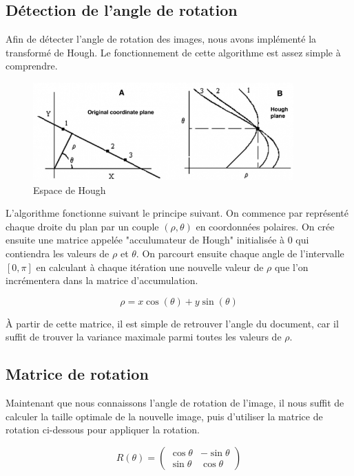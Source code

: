\documentclass[11pt]{report}
\begin{document}
\subsection{Détection de l'angle de rotation}

Afin de détecter l'angle de rotation des images, nous avons implémenté la transformé de Hough. Le fonctionnement de cette algorithme est assez simple à comprendre.

\begin{figure}[htbp]
\centering
\includegraphics[width=10cm]{hough.jpg}
\caption{Espace de Hough}
\end{figure}

L'algorithme fonctionne suivant le principe suivant. On commence par représenté chaque droite du plan par un couple $(\rho, \theta)$ en coordonnées polaires. On crée ensuite une matrice appelée "acculumateur de Hough" initialisée à 0 qui contiendra les valeurs de $\rho$ et $\theta$. On parcourt ensuite chaque angle de l’intervalle $[0, \pi]$ en calculant à chaque itération une nouvelle valeur de $\rho$ que l'on incrémentera dans la matrice d'accumulation.

\[ \rho = x\cos \left( \theta \right) + y\sin \left( \theta \right) \]

À partir de cette matrice, il est simple de retrouver l'angle du document, car il suffit de trouver la variance maximale parmi toutes les valeurs de $\rho$.

\subsection{Matrice de rotation}

Maintenant que nous connaissons l'angle de rotation de l'image, il nous suffit de calculer la taille optimale de la nouvelle image, puis d'utiliser la matrice de rotation ci-dessous pour appliquer la rotation.

\[ R \left( \theta \right) = \begin{pmatrix}
   \cos \theta & - \sin \theta \\
   \sin \theta & \cos \theta 
\end{pmatrix} \]
\end{document}
